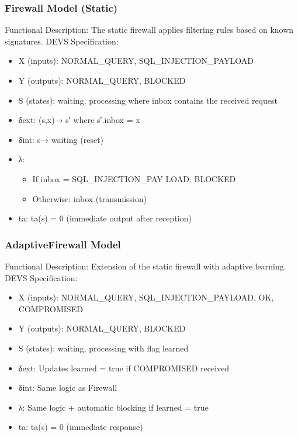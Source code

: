 \documentclass{article}
\begin{document}
\subsubsection{Firewall Model (Static)}
Functional Description: The static firewall applies filtering rules based on known signatures.
DEVS Specification:
\begin{itemize}
    \item X (inputs): {NORMAL\_QUERY, SQL\_INJECTION\_PAYLOAD}
    \item Y (outputs): {NORMAL\_QUERY, BLOCKED}
    \item S (states): {waiting, processing} where inbox contains the received request
    \item δext: (s,x)→ s′ where s′.inbox = x
    \item δint: s→ waiting (reset)
    \item λ:
    \begin{itemize}
        \item If inbox = SQL\_INJECTION\_PAY LOAD: BLOCKED
        \item Otherwise: inbox (transmission)
    \end{itemize}
    \item ta: ta(s) = 0 (immediate output after reception)
\end{itemize}

\subsubsection{AdaptiveFirewall Model}
Functional Description: Extension of the static firewall with adaptive learning.
DEVS Specification:
\begin{itemize}
    \item X (inputs): {NORMAL\_QUERY, SQL\_INJECTION\_PAYLOAD, OK, COMPROMISED}
    \item Y (outputs): {NORMAL\_QUERY, BLOCKED}
    \item S (states): {waiting, processing} with flag learned
    \item δext: Updates learned = true if COMPROMISED received
    \item δint: Same logic as Firewall
    \item λ: Same logic + automatic blocking if learned = true
    \item ta: ta(s) = 0 (immediate response)
\end{itemize}
\end{document}
